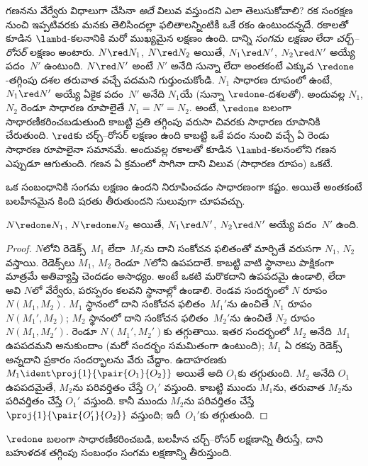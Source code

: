 \documentclass[../../../include/open-logic-section]{subfiles}
\begin{document}
గణనను వేర్వేరు విధాలుగా చేసినా \emph{అదే} విలువ వస్తుందని ఎలా తెలుసుకోవాలి? రక సంరక్షణ నుంచి ఇప్పటివరకు మనకు తెలిసిందల్లా ఫలితాలన్నింటికీ ఒకే రకం ఉంటుందన్నదే. రకాలతో కూడిన $\lambd$-కలనానికి మరో ముఖ్యమైన లక్షణం ఉంది. దాన్ని \emph{సంగమ లక్షణం} లేదా \emph{చర్చ్--రోసర్} లక్షణం అంటారు. $N \red N_1$, $N \red
N_2$ అయితే, $N_1 \red N'$, $N_2 \red
N'$ అయ్యే పదం~$N'$ ఉంటుంది. $N \red N'$ అంటే $N'$ అనేది సున్నా లేదా అంతకంటే ఎక్కువ $\redone$-తగ్గింపు దశల తరువాత వచ్చే పదమని గుర్తుంచుకోండి. $N_1$ సాధారణ రూపంలో ఉంటే, $N_1 \red N'$ అయ్యే ఏకైక పదం~$N'$ అనేది $N_1$యే (సున్నా $\redone$-దశలతో). అందువల్ల $N_1$, $N_2$ రెండూ సాధారణ రూపాలైతే $N_1 = N' = N_2$. అంటే, $\redone$ బలంగా సాధారణీకరించబడుతుంది కాబట్టి ప్రతి తగ్గింపు వరుసా చివరకు సాధారణ రూపానికి చేరుతుంది. $\red$కు చర్చ్--రోసర్ లక్షణం ఉంది కాబట్టి ఒకే పదం నుంచి వచ్చే ఏ రెండు సాధారణ రూపాలైనా సమానమే. అందువల్ల రకాలతో కూడిన $\lambd$-కలనంలోని గణన ఎప్పుడూ ఆగుతుంది. గణన ఏ క్రమంలో సాగినా దాని విలువ (సాధారణ రూపం) ఒకటే.

ఒక సంబంధానికి సంగమ లక్షణం ఉందని నిరూపించడం సాధారణంగా కష్టం. అయితే అంతకంటే బలహీనమైన కింది షరతు తీరుతుందని సులువుగా చూపవచ్చు.

\begin{prop}[బలహీన చర్చ్--రోసర్ లక్షణం]
$N \redone N_1$, $N \redone N_2$ అయితే, $N_1 \red N'$, $N_2 \red N'$ అయ్యే పదం~$N'$ ఉంది.
\end{prop}

\begin{proof}
  $N$లోని రెడెక్స్~$M_1$ లేదా~$M_2$ను దాని సంకోచన ఫలితంతో మార్చితే వరుసగా $N_1$, $N_2$ వస్తాయి. రెడెక్స్‌లు $M_1$, $M_2$ రెండూ $N$లోని ఉపపదాలే. కాబట్టి వాటి స్థానాలు పాక్షికంగా మాత్రమే అతివ్యాప్తి చెందడం అసాధ్యం. అంటే ఒకటి మరొకదాని ఉపపదమై ఉండాలి, లేదా అవి $N$లో వేర్వేరు, పరస్పరం కలవని స్థానాల్లో ఉండాలి. రెండవ సందర్భంలో $N$ రూపం $N(M_1,M_2)$. $M_1$ స్థానంలో దాని సంకోచన ఫలితం~$M_1'$ను ఉంచితే $N_1$ రూపం $N(M_1',M_2)$; $M_2$ స్థానంలో దాని సంకోచన ఫలితం~$M_2'$ను ఉంచితే $N_2$ రూపం $N(M_1,M_2')$. రెండూ $N(M_1',M_2')$కు తగ్గుతాయి. ఇతర సందర్భంలో $M_2$ అనేది~$M_1$ ఉపపదమని అనుకుందాం (మరో సందర్భం సమమితంగా ఉంటుంది); $M_1$ ఏ రకపు రెడెక్స్ అన్నదాని ప్రకారం సందర్భాలను వేరు చేద్దాం. ఉదాహరణకు $M_1 \ident
  \proj{1}{\pair{O_1}{O_2}}$ అయితే అది $O_1$కు తగ్గుతుంది. $M_2$ అనేది $O_1$ ఉపపదమైతే, $M_2$ను పరివర్తితం చేస్తే $O_1'$ వస్తుంది. కాబట్టి ముందు $M_1$ను, తరువాత $M_2$ను పరివర్తితం చేస్తే $O_1'$ వస్తుంది. కానీ ముందు $M_2$ను పరివర్తితం చేస్తే $\proj{1}{\pair{O_1'}{O_2}}$ వస్తుంది; ఇదీ~$O_1'$కు తగ్గుతుంది.
\end{proof}

\begin{lem}[న్యూమన్ లెమ్మా]
$\redone$ బలంగా సాధారణీకరించబడి, బలహీన చర్చ్--రోసర్ లక్షణాన్ని తీరుస్తే, దాని బహుళదశ తగ్గింపు సంబంధం సంగమ లక్షణాన్ని తీరుస్తుంది.
\end{lem}
\end{document}
